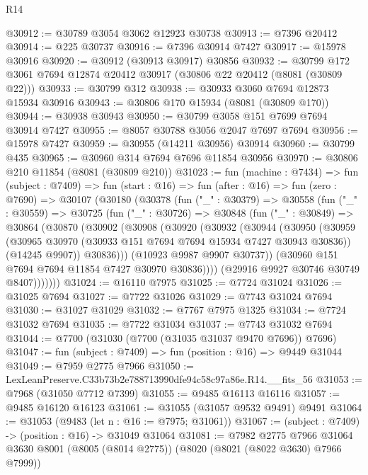 \begin{lexlean}{R14}
\begin{coremodule}
@30912 := @30789 @3054 @3062 @12923 @30738
@30913 := @7396 @20412
@30914 := @225 @30737
@30916 := @7396 @30914 @7427
@30917 := @15978 @30916
@30920 := @30912 (@30913 @30917) @30856
@30932 := @30799 @172 @3061 @7694 @12874 @20412 @30917 (@30806 @22 @20412 (@8081 (@30809 @22)))
@30933 := @30799 @312
@30938 := @30933 @3060 @7694 @12873 @15934 @30916
@30943 := @30806 @170 @15934 (@8081 (@30809 @170))
@30944 := @30938 @30943
@30950 := @30799 @3058 @151 @7699 @7694 @30914 @7427
@30955 := @8057 @30788 @3056 @2047 @7697 @7694
@30956 := @15978 @7427
@30959 := @30955 (@14211 @30956) @30914
@30960 := @30799 @435
@30965 := @30960 @314 @7694 @7696 @11854 @30956
@30970 := @30806 @210 @11854 (@8081 (@30809 @210))
@31023 := fun (machine : @7434) =>
  fun (subject : @7409) =>
  fun (start : @16) =>
  fun (after : @16) =>
  fun (zero : @7690) =>
  @30107
    (@30180
      (@30378
        (fun ("_" : @30379) =>
        @30558
          (fun ("_" : @30559) =>
          @30725
            (fun ("_" : @30726) =>
            @30848
              (fun ("_" : @30849) =>
              @30864
                (@30870
                  (@30902
                    (@30908
                      (@30920
                        (@30932
                          (@30944
                            (@30950
                              (@30959
                                (@30965 @30970 (@30933 @151 @7694 @7694 @15934 @7427 @30943 @30836))
                                (@14245 @9907))
                              @30836)))
                        (@10923 @9987 @9907 @30737))
                      (@30960 @151 @7694 @7694 @11854 @7427 @30970 @30836))))
                (@29916 @9927 @30746 @30749 @8407)))))))
@31024 := @16110 @7975
@31025 := @7724 @31024
@31026 := @31025 @7694
@31027 := @7722 @31026
@31029 := @7743 @31024 @7694
@31030 := @31027 @31029
@31032 := @7767 @7975 @1325
@31034 := @7724 @31032 @7694
@31035 := @7722 @31034
@31037 := @7743 @31032 @7694
@31044 := @7700 (@31030 (@7700 (@31035 @31037 @9470 @7696)) @7696)
@31047 := fun (subject : @7409) => fun (position : @16) => @9449 @31044
@31049 := @7959 @2775 @7966
@31050 := LexLeanPreserve.C33b73b2e788713990dfe94c58c97a86e.R14.__fits_56
@31053 := @7968 (@31050 @7712 @7399)
@31055 := @9485 @16113 @16116
@31057 := @9485 @16120 @16123
@31061 := @31055 (@31057 @9532 @9491) @9491
@31064 := @31053 (@9483 (let n : @16 := @7975; @31061))
@31067 := (subject : @7409) -> (position : @16) -> @31049 @31064
@31081 := @7982
    @2775
    @7966
    @31064
    @3630
    @8001
    (@8005 (@8014 @2775))
    (@8020 (@8021 (@8022 @3630) @7966 @7999))

\end{coremodule}
\end{lexlean}
